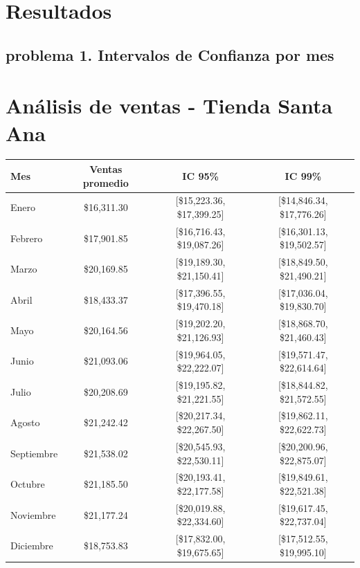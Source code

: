 
\section{Resultados}

\subsection{problema 1. Intervalos de Confianza por mes}




\section*{Análisis de ventas - Tienda Santa Ana}

\begin{longtable}{@{}lccc@{}}
\toprule
\textbf{Mes}       & \textbf{Ventas promedio} & \textbf{IC 95\%}               & \textbf{IC 99\%}               \\
\midrule
Enero       & \$16,311.30 & [\$15,223.36, \$17,399.25] & [\$14,846.34, \$17,776.26] \\
Febrero     & \$17,901.85 & [\$16,716.43, \$19,087.26] & [\$16,301.13, \$19,502.57] \\
Marzo       & \$20,169.85 & [\$19,189.30, \$21,150.41] & [\$18,849.50, \$21,490.21] \\
Abril       & \$18,433.37 & [\$17,396.55, \$19,470.18] & [\$17,036.04, \$19,830.70] \\
Mayo        & \$20,164.56 & [\$19,202.20, \$21,126.93] & [\$18,868.70, \$21,460.43] \\
Junio       & \$21,093.06 & [\$19,964.05, \$22,222.07] & [\$19,571.47, \$22,614.64] \\
Julio       & \$20,208.69 & [\$19,195.82, \$21,221.55] & [\$18,844.82, \$21,572.55] \\
Agosto      & \$21,242.42 & [\$20,217.34, \$22,267.50] & [\$19,862.11, \$22,622.73] \\
Septiembre  & \$21,538.02 & [\$20,545.93, \$22,530.11] & [\$20,200.96, \$22,875.07] \\
Octubre     & \$21,185.50 & [\$20,193.41, \$22,177.58] & [\$19,849.61, \$22,521.38] \\
Noviembre   & \$21,177.24 & [\$20,019.88, \$22,334.60] & [\$19,617.45, \$22,737.04] \\
Diciembre   & \$18,753.83 & [\$17,832.00, \$19,675.65] & [\$17,512.55, \$19,995.10] \\
\bottomrule
\end{longtable}


